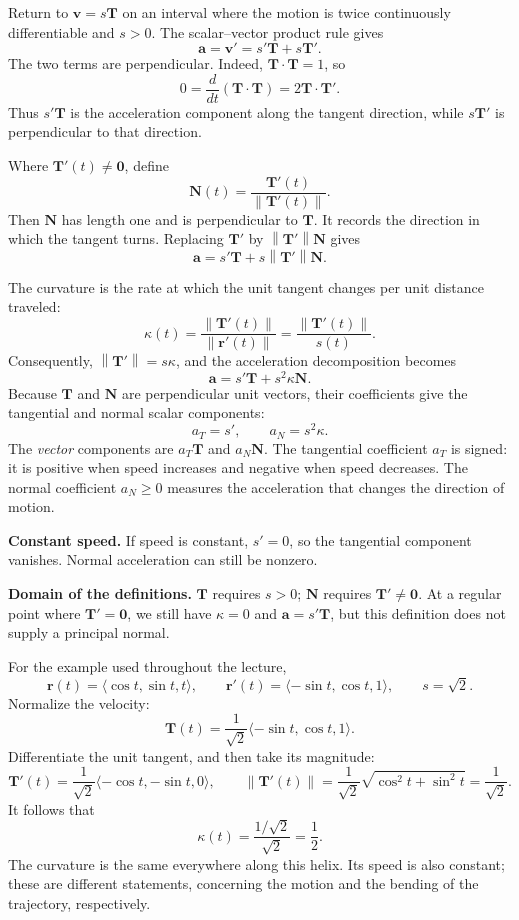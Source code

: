 \documentclass[11pt,letterpaper]{article}
\newcommand{\R}{\mathbf r}
\newcommand{\V}{\mathbf v}
\newcommand{\A}{\mathbf a}
\newcommand{\T}{\mathbf T}
\newcommand{\N}{\mathbf N}
\newcommand{\norm}[1]{\left\lVert#1\right\rVert}
\newcommand{\heading}[1]{\vspace{5pt}{\large\bfseries #1}\par}
\newcommand{\subhead}[1]{\textbf{#1}\quad}
\begin{document}
\newpage
\heading{Tangential and normal acceleration}
Return to $\V=s\T$ on an interval where the motion is twice continuously differentiable and $s>0$. The scalar--vector product rule gives
\[
 \A=\V'=s'\T+s\T'.
\]
The two terms are perpendicular. Indeed, $\T\cdot\T=1$, so
\[
 0=\frac{d}{dt}(\T\cdot\T)=2\T\cdot\T'.
\]
Thus $s'\T$ is the acceleration component along the tangent direction, while $s\T'$ is perpendicular to that direction.

\heading{The principal unit normal}
Where $\T'(t)\ne\mathbf0$, define
\[
 \boxed{\N(t)=\frac{\T'(t)}{\norm{\T'(t)}}.}
\]
Then $\N$ has length one and is perpendicular to $\T$. It records the direction in which the tangent turns. Replacing $\T'$ by $\norm{\T'}\N$ gives
\[
 \A=s'\T+s\norm{\T'}\N.
\]

\heading{Curvature}
The curvature is the rate at which the unit tangent changes per unit distance traveled:
\[
 \boxed{\kappa(t)=\frac{\norm{\T'(t)}}{\norm{\R'(t)}}
                         =\frac{\norm{\T'(t)}}{s(t)}.}
\]
Consequently, $\norm{\T'}=s\kappa$, and the acceleration decomposition becomes
\[
 \boxed{\A=s'\T+s^2\kappa\N.}
\]
Because $\T$ and $\N$ are perpendicular unit vectors, their coefficients give the tangential and normal scalar components:
\[
 \boxed{a_T=s',\qquad a_N=s^2\kappa.}
\]
The \emph{vector} components are $a_T\T$ and $a_N\N$. The tangential coefficient $a_T$ is signed: it is positive when speed increases and negative when speed decreases. The normal coefficient $a_N\ge0$ measures the acceleration that changes the direction of motion.

\subhead{Constant speed.} If speed is constant, $s'=0$, so the tangential component vanishes. Normal acceleration can still be nonzero.

\subhead{Domain of the definitions.} $\T$ requires $s>0$; $\N$ requires $\T'\ne\mathbf0$. At a regular point where $\T'=\mathbf0$, we still have $\kappa=0$ and $\A=s'\T$, but this definition does not supply a principal normal.

\newpage
\heading{Computing the curvature of the helix}
For the example used throughout the lecture,
\[
 \R(t)=\langle\cos t,\sin t,t\rangle,
 \qquad\R'(t)=\langle-\sin t,\cos t,1\rangle,
 \qquad s=\sqrt2.
\]
Normalize the velocity:
\[
 \T(t)=\frac1{\sqrt2}\langle-\sin t,\cos t,1\rangle.
\]
Differentiate the unit tangent, and then take its magnitude:
\[
 \T'(t)=\frac1{\sqrt2}\langle-\cos t,-\sin t,0\rangle,
 \qquad
 \norm{\T'(t)}=\frac1{\sqrt2}\sqrt{\cos^2t+\sin^2t}
              =\frac1{\sqrt2}.
\]
It follows that
\[
 \boxed{\kappa(t)=\frac{1/\sqrt2}{\sqrt2}=\frac12.}
\]
The curvature is the same everywhere along this helix. Its speed is also constant; these are different statements, concerning the motion and the bending of the trajectory, respectively.
\end{document}
